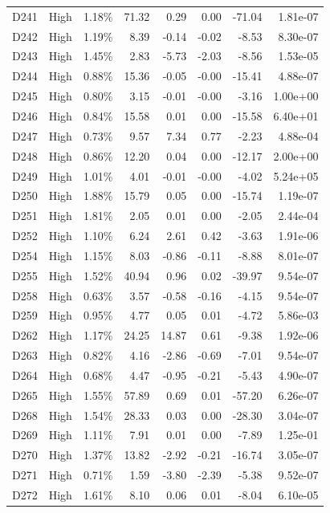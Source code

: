 \begin{tabular}{l l r r r r r r}
D241 & High & 1.18\% & 71.32 & 0.29 & 0.00 & -71.04 & 1.81e-07 \\
D242 & High & 1.19\% & 8.39 & -0.14 & -0.02 & -8.53 & 8.30e-07 \\
D243 & High & 1.45\% & 2.83 & -5.73 & -2.03 & -8.56 & 1.53e-05 \\
D244 & High & 0.88\% & 15.36 & -0.05 & -0.00 & -15.41 & 4.88e-07 \\
D245 & High & 0.80\% & 3.15 & -0.01 & -0.00 & -3.16 & 1.00e+00 \\
D246 & High & 0.84\% & 15.58 & 0.01 & 0.00 & -15.58 & 6.40e+01 \\
D247 & High & 0.73\% & 9.57 & 7.34 & 0.77 & -2.23 & 4.88e-04 \\
D248 & High & 0.86\% & 12.20 & 0.04 & 0.00 & -12.17 & 2.00e+00 \\
D249 & High & 1.01\% & 4.01 & -0.01 & -0.00 & -4.02 & 5.24e+05 \\
D250 & High & 1.88\% & 15.79 & 0.05 & 0.00 & -15.74 & 1.19e-07 \\
D251 & High & 1.81\% & 2.05 & 0.01 & 0.00 & -2.05 & 2.44e-04 \\
D252 & High & 1.10\% & 6.24 & 2.61 & 0.42 & -3.63 & 1.91e-06 \\
D254 & High & 1.15\% & 8.03 & -0.86 & -0.11 & -8.88 & 8.01e-07 \\
D255 & High & 1.52\% & 40.94 & 0.96 & 0.02 & -39.97 & 9.54e-07 \\
D258 & High & 0.63\% & 3.57 & -0.58 & -0.16 & -4.15 & 9.54e-07 \\
D259 & High & 0.95\% & 4.77 & 0.05 & 0.01 & -4.72 & 5.86e-03 \\
D262 & High & 1.17\% & 24.25 & 14.87 & 0.61 & -9.38 & 1.92e-06 \\
D263 & High & 0.82\% & 4.16 & -2.86 & -0.69 & -7.01 & 9.54e-07 \\
D264 & High & 0.68\% & 4.47 & -0.95 & -0.21 & -5.43 & 4.90e-07 \\
D265 & High & 1.55\% & 57.89 & 0.69 & 0.01 & -57.20 & 6.26e-07 \\
D268 & High & 1.54\% & 28.33 & 0.03 & 0.00 & -28.30 & 3.04e-07 \\
D269 & High & 1.11\% & 7.91 & 0.01 & 0.00 & -7.89 & 1.25e-01 \\
D270 & High & 1.37\% & 13.82 & -2.92 & -0.21 & -16.74 & 3.05e-07 \\
D271 & High & 0.71\% & 1.59 & -3.80 & -2.39 & -5.38 & 9.52e-07 \\
D272 & High & 1.61\% & 8.10 & 0.06 & 0.01 & -8.04 & 6.10e-05 \\

\end{tabular}
